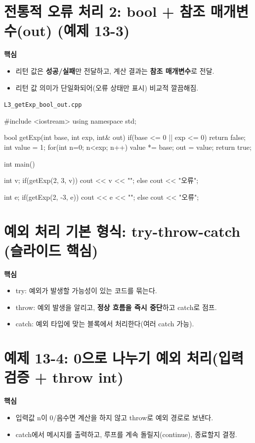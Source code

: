\documentclass[11pt,a4paper]{article}
\newcommand{\filetag}[1]{\texttt{\color{Accent}#1}}
\begin{document}
\section{전통적 오류 처리 2: bool + 참조 매개변수(out) (예제 13-3)}
\begin{GoalBox}
\textbf{핵심}
\begin{itemize}[leftmargin=18pt]
  \item 리턴 값은 \textbf{성공/실패}만 전달하고, 계산 결과는 \textbf{참조 매개변수}로 전달.
  \item 리턴 값 의미가 단일화되어(오류 상태만 표시) 비교적 깔끔해짐.
\end{itemize}
\end{GoalBox}

\noindent\filetag{L3\_getExp\_bool\_out.cpp}
\begin{cppcode}
#include <iostream>
using namespace std;

bool getExp(int base, int exp, int& out) {
    if(base <= 0 || exp <= 0) return false;
    int value = 1;
    for(int n=0; n<exp; n++) value *= base;
    out = value;
    return true;
}

int main() {
    int v;
    if(getExp(2, 3, v)) cout << v << "\n";
    else cout << "오류\n";

    int e;
    if(getExp(2, -3, e)) cout << e << "\n";
    else cout << "오류\n";
}
\end{cppcode}

\section{예외 처리 기본 형식: try-throw-catch (슬라이드 핵심)}
\begin{GoalBox}
\textbf{핵심}
\begin{itemize}[leftmargin=18pt]
  \item try: 예외가 발생할 가능성이 있는 코드를 묶는다.
  \item throw: 예외 발생을 알리고, \textbf{정상 흐름을 즉시 중단}하고 catch로 점프.
  \item catch: 예외 타입에 맞는 블록에서 처리한다(여러 catch 가능).
\end{itemize}
\end{GoalBox}

\section{예제 13-4: 0으로 나누기 예외 처리(입력 검증 + throw int)}
\begin{GoalBox}
\textbf{핵심}
\begin{itemize}[leftmargin=18pt]
  \item 입력값 n이 0/음수면 계산을 하지 않고 throw로 예외 경로로 보낸다.
  \item catch에서 메시지를 출력하고, 루프를 계속 돌릴지(continue), 종료할지 결정.
\end{itemize}
\end{GoalBox}
\end{document}
